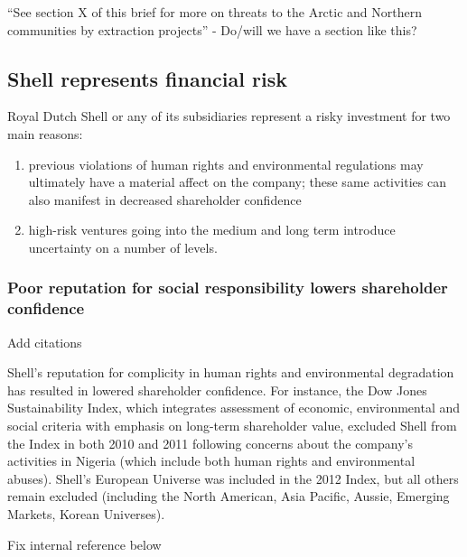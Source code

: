 \begin{vcom}
``See section X of this brief for more on threats to the Arctic and Northern communities by extraction projects'' - Do/will we have a section like this?
\end{vcom}



	\subsection{Shell represents financial risk}
	


Royal Dutch Shell or any of its subsidiaries represent a risky investment for two main reasons:
\begin{enumerate}
	\item previous violations of human rights and environmental regulations may ultimately have a material affect on the company; these same activities can also manifest in decreased shareholder confidence
	\item high-risk ventures going into the medium and long term introduce uncertainty on a number of levels.
\end{enumerate}

	
	
	\subsubsection{Poor reputation for social responsibility lowers shareholder confidence}
	
\begin{vcom}
	Add citations
\end{vcom}
	
Shell's reputation for complicity in human rights and environmental degradation has resulted in lowered shareholder confidence. 
For instance, the Dow Jones Sustainability Index, which integrates assessment of economic, environmental and social criteria with emphasis on long-term shareholder value, excluded Shell from the Index in both 2010 and 2011 following concerns about the company's activities in Nigeria (which include both human rights and environmental abuses). 
Shell's European Universe was included in the 2012 Index, but all others remain excluded (including the North American, Asia Pacific, Aussie, Emerging Markets, Korean Universes).

\begin{vcom}
	Fix internal reference below
\end{vcom}

